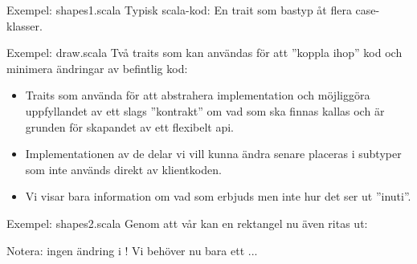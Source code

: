 \begin{Slide}{Exempel: shapes1.scala}
Typisk scala-kod: En trait som bastyp åt flera case-klasser.
\end{Slide}


\begin{Slide}{Exempel: draw.scala}
Två traits som kan användas för att ''koppla ihop'' kod och minimera ändringar av befintlig kod:

\pause
\setlength{\leftmargini}{0pt}
\begin{itemize}\SlideFontSmall
\item  Traits som använda för att abstrahera implementation och möjliggöra uppfyllandet av ett slags ''kontrakt'' om vad som ska finnas kallas   och är grunden för skapandet av ett flexibelt api. 

\item Implementationen av de delar vi vill kunna ändra senare placeras i subtyper som inte används direkt av klientkoden. 

\item Vi visar bara information om vad som erbjuds men inte hur det ser ut ''inuti''.

\end{itemize}
\end{Slide}

\begin{Slide}{Exempel: shapes2.scala}\SlideFontTiny
Genom att  vår  kan en rektangel nu även ritas ut:


\pause
\vspace{-0.5em}Notera: ingen ändring i ! Vi behöver nu bara ett ...
\end{Slide}


